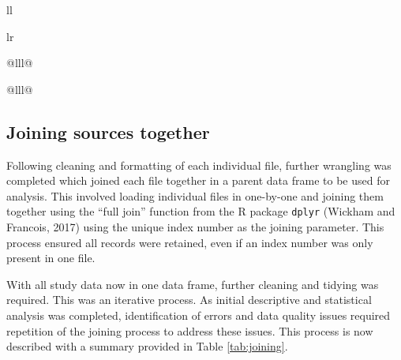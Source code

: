 \documentclass[12pt,a4paper,oneside,table]{report}
\begin{document}
\begin{tabular}[t]{ll}
\begin{tabular}{lr}
{\begin{tabular}{@{}lll@{}}
\begin{tabular}{@{}lll@{}}
\FloatBarrier

\subsection{Joining sources together}\label{subsec:join-data}

\FloatBarrier

Following cleaning and formatting of each individual file, further
wrangling was completed which joined each file together in a parent data
frame to be used for analysis. This involved loading individual files in
one-by-one and joining them together using the ``full join'' function
from the R package \texttt{dplyr} (Wickham and Francois, 2017) using the
unique index number as the joining parameter. This process ensured all
records were retained, even if an index number was only present in one
file.

With all study data now in one data frame, further cleaning and tidying
was required. This was an iterative process. As initial descriptive and
statistical analysis was completed, identification of errors and data
quality issues required repetition of the joining process to address
these issues. This process is now described with a summary provided in
Table \ref{tab:joining}.

\begin{table}[h]
\centering
{}
\caption{Joining files together and cleaning process}
\label{tab:joining}
\end{table}


\end{tabular}
\end{tabular}}
\end{tabular}
\end{tabular}
\end{document}

